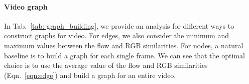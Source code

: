 \documentclass[twocolumn]{article}
\begin{document}
\paragraph*{Video graph} 
In Tab.~\ref{tab: graph_building}, we provide an analysis for different ways to construct graphs for video. For edges, we also consider the minimum and maximum values between the flow and RGB similarities. For nodes, a natural baseline is to build a graph for each single frame. We can see that the optimal choice is to use the average value of the flow and RGB similarities (Eqn.~\ref{eqn:edge}) and build a graph for an entire video.
\end{document}
